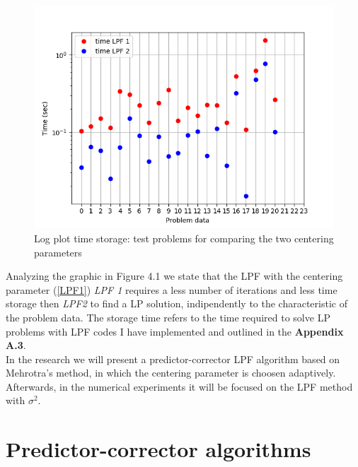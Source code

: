 \documentclass[a4paper,10 pt,titlepage,twoside]{book}
\theoremstyle{plain}
\theoremstyle{definition}
\theoremstyle{remark}
\begin{document}
\begin{figure}\label{fig:float}
\begin{center}
\includegraphics[width=9 cm]{timeLPF12}\caption{Log plot time storage: test problems for comparing the two centering parameters} 
\end{center}
\end{figure}
Analyzing the graphic in Figure 4.1 we state that the LPF with the centering parameter (\ref{LPF1}) \textit{LPF 1} requires a less number of iterations and less time storage then \textit{LPF2} to find a LP solution, indipendently to the characteristic of the problem data. The storage time refers to the time required to solve LP problems with LPF codes I have implemented and outlined in the \textbf{Appendix A.3}.\\
In the research we will present a predictor-corrector LPF algorithm based on Mehrotra's method, in which the centering parameter is choosen adaptively.\\
Afterwards, in the numerical experiments it will be focused on the LPF method with  $\sigma^{2}$.

\section{Predictor-corrector algorithms}\label{sec:pc}
\end{document}
